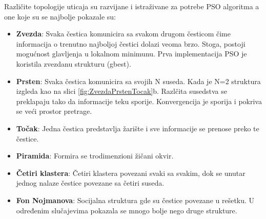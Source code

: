 \documentclass[a4paper]{article}
\begin{document}
Različite topologije uticaja su razvijane i istraživane za potrebe PSO algoritma a one koje su se najbolje pokazale su:
\begin{itemize}
    \item \textbf{Zvezda}: Svaka čestica komunicira sa svakom drugom česticom čime informacija o trenutno najboljoj čestici dolazi veoma brzo. Stoga, postoji mogućnost glavljenja u lokalnom minimunu. Prva implementacija PSO je koristila zvezdanu strukturu (gbest).
    \item \textbf{Prsten}: Svaka čestica komunicira sa svojih N suseda. Kada je N=2 struktura izgleda kao na slici \ref{fig:ZvezdaPrstenTocak}b. Razlčita susedstva se preklapaju tako da informacije teku sporije. Konvergencija je sporija i pokriva se veći prostor pretrage.
    \item \textbf{Točak}: Jedna čestica predstavlja žarište i sve informacije se prenose preko te čestice.
    \item \textbf{Piramida}: Formira se trodimenzioni žičani okvir.
    \item \textbf{Četiri klastera}: Četiri klastera povezani svaki sa svakim, dok se unutar jednog nalaze čestice povezane sa četiri suseda.
    \item \textbf{Fon Nojmanova}: Socijalna struktura gde su čestice povezane u rešetku. U određenim slučajevima pokazala se mnogo bolje nego druge strukture.
\end{itemize}
\end{document}
